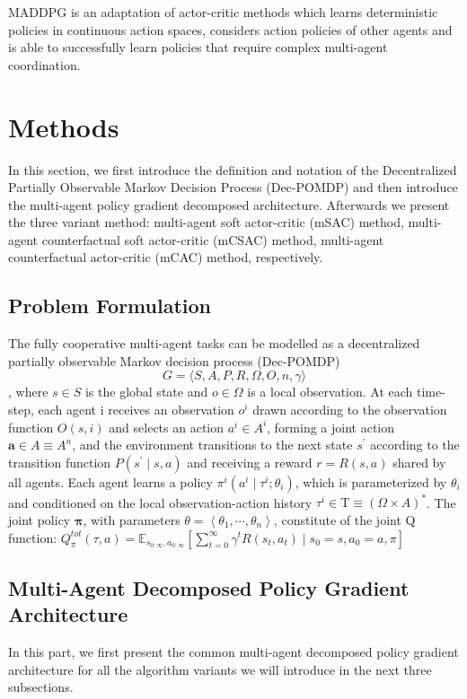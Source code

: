 \documentclass[runningheads]{llncs}
\begin{document}
MADDPG\cite{b10} is an adaptation of actor-critic methods which learns deterministic policies in continuous action spaces, considers action policies of other agents and is able to successfully learn policies that require complex multi-agent coordination.





\section{Methods}

In this section, we first introduce the definition and notation of the Decentralized Partially Observable Markov Decision Process (Dec-POMDP) and then introduce the multi-agent policy gradient decomposed architecture. Afterwards we present the three variant method: multi-agent soft actor-critic (mSAC) method, multi-agent counterfactual soft actor-critic (mCSAC) method, multi-agent counterfactual actor-critic (mCAC) method, respectively.
\subsection{Problem Formulation}
The fully cooperative multi-agent tasks can be modelled as a decentralized partially observable Markov decision process (Dec-POMDP) \cite{b12} $$G=\langle S, A, P, R, \Omega, O, n, \gamma\rangle$$, 
where $s \in S$ is the global state and 
$o \in \Omega$ is a local observation.
At each time-step, each agent i
receives an observation $ o^i$ drawn according to the observation function 
$O(s, i)$ and selects an action $a^{i} \in A^{i}$, forming a joint action $\boldsymbol{a} \in {A} \equiv {A^n} $, and the environment transitions to the next state $s^{\prime}$ according to the
transition function $P\left(s^{\prime} \mid s, a\right)$ and receiving a reward $r=R(s, a)$ shared by all agents. Each agent learns a
policy $\pi^{i}\left(a^{i} \mid \tau^{i} ; \theta_{i}\right)$, which is parameterized by $\theta_{i}$ and conditioned on the local observation-action history $\tau^{i} \in \mathrm{T} \equiv
(\Omega \times A)^{*}$. The joint policy $\boldsymbol{\pi}$, with parameters $\theta=\left\langle\theta_{1}, \cdots, \theta_{n}\right\rangle$, constitute of the joint Q function:
$	Q_{\pi}^{ t o t}(\tau, a)=\mathbb{E}_{s_{0: \infty}, a_{0: \infty}}\left[\sum_{t=0}^{\infty} \gamma^{t} R\left(s_{t}, a_{t}\right) \mid s_{0}=s, a_{0}=a, \pi\right]$
\subsection{Multi-Agent Decomposed Policy Gradient Architecture}
In this part, 
we first present the common multi-agent decomposed policy gradient architecture for all the algorithm variants we will introduce in the next three subsections.
\end{document}
